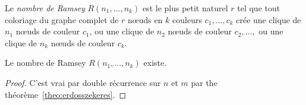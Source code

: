 \begin{mydef} 
Le \emph{nombre de Ramsey} $R(n_1 , ..., n_k)$ est le plus petit naturel $r$ tel que tout coloriage du graphe complet de $r$ nœuds en $k$ couleurs $c_1, \ldots, c_k$ crée une clique de $n_1$ nœuds de couleur $c_1$, ou une clique de $n_2$ nœuds de couleur $c_2, ...,$ ou une clique de $n_k$ nœuds de couleur $c_k$.
\end{mydef}

\begin{mytheo} 
  Le nombre de Ramsey $R(n_1,...,n_k)$ existe.
  \begin{proof}
    C'est vrai par double récurrence sur $n$ et $m$ par the théorème~\ref{theo:erdosszekeres}.
  \end{proof}
\end{mytheo}

